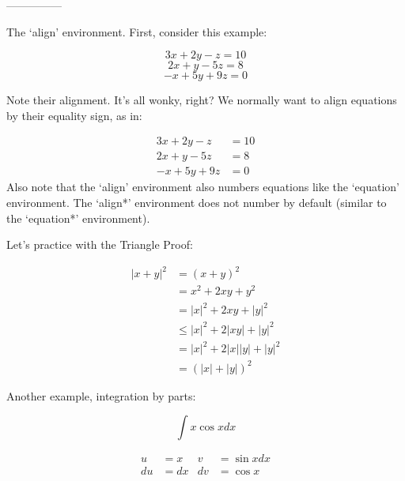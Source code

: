 \documentclass{article}
\begin{document}
---------------

The `align' environment.  First, consider this example:

\[ 3x + 2y - z = 10\]
\[ 2x + y -5z = 8 \]
\[ -x + 5y + 9z = 0 \]

Note their alignment.  It's all wonky, right?  We normally want to align equations by their equality sign, as in:


\begin{align}
3x + 2y - z &= 10 \\ %
2x + y -5z &= 8 \\
-x + 5y + 9z &= 0 
\end{align}
Also note that the `align' environment also numbers equations like the `equation' environment.  The `align*' environment does not number by default (similar to the `equation*' environment).

Let's practice with the Triangle Proof:

\begin{align*}
|x + y|^2 &= (x + y)^2 \\
 &= x^2 + 2xy + y^2 \\
 &= |x|^2 + 2xy + |y|^2 \\
 &\leq |x|^2 + 2|xy| + |y|^2 \\
&= |x|^2 + 2|x| |y| + |y|^2 \\
 &= (|x| + |y|)^2
\end{align*}

Another example, integration by parts:

$$\int x \cos x dx$$

\begin{align*}
u &= x & v &= \sin x dx \\ %
du &= dx & dv &= \cos x
\end{align*}
\end{document}
